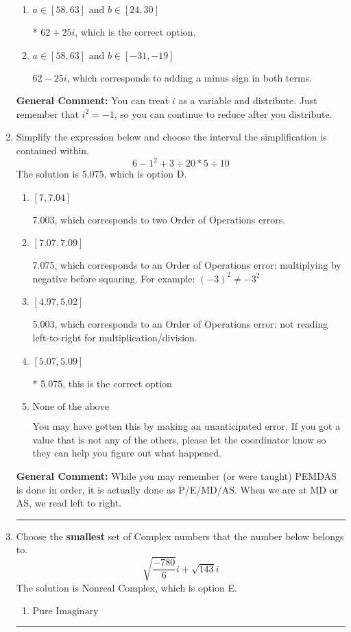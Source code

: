 \documentclass{extbook}[14pt]
\newcommand{\litem}[1]{\item #1

\rule{\textwidth}{0.4pt}}
\begin{document}
\begin{enumerate}
{\begin{enumerate}[label=\Alph*.]
 $12 - 50 i$, which corresponds to just multiplying the real terms to get the real part of the solution and the coefficients in the complex terms to get the complex part.
\item \( a \in [58, 63] \text{ and } b \in [24, 30] \)

* $62 + 25 i$, which is the correct option.
\item \( a \in [58, 63] \text{ and } b \in [-31, -19] \)

 $62 - 25 i$, which corresponds to adding a minus sign in both terms.
\end{enumerate}

\textbf{General Comment:} You can treat $i$ as a variable and distribute. Just remember that $i^2=-1$, so you can continue to reduce after you distribute.
}
\litem{
Simplify the expression below and choose the interval the simplification is contained within.
\[ 6 - 1^2 + 3 \div 20 * 5 \div 10 \]The solution is \( 5.075 \), which is option D.\begin{enumerate}[label=\Alph*.]
\item \( [7, 7.04] \)

 7.003, which corresponds to two Order of Operations errors.
\item \( [7.07, 7.09] \)

 7.075, which corresponds to an Order of Operations error: multiplying by negative before squaring. For example: $(-3)^2 \neq -3^2$
\item \( [4.97, 5.02] \)

 5.003, which corresponds to an Order of Operations error: not reading left-to-right for multiplication/division.
\item \( [5.07, 5.09] \)

* 5.075, this is the correct option
\item \( \text{None of the above} \)

 You may have gotten this by making an unanticipated error. If you got a value that is not any of the others, please let the coordinator know so they can help you figure out what happened.
\end{enumerate}

\textbf{General Comment:} While you may remember (or were taught) PEMDAS is done in order, it is actually done as P/E/MD/AS. When we are at MD or AS, we read left to right.
}
\litem{
Choose the \textbf{smallest} set of Complex numbers that the number below belongs to.
\[ \sqrt{\frac{-780}{6}} i+\sqrt{143}i \]The solution is \( \text{Nonreal Complex} \), which is option E.\begin{enumerate}[label=\Alph*.]
\item \( \text{Pure Imaginary} \)


\end{enumerate}}
\end{enumerate}
\end{document}
